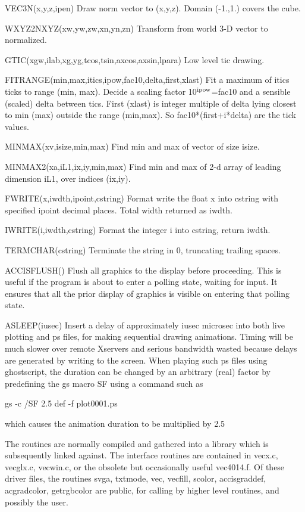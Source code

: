 VEC3N(x,y,z,ipen) Draw norm vector to (x,y,z). Domain (-1.,1.) covers
the cube.

WXYZ2NXYZ(xw,yw,zw,xn,yn,zn) Transform from world 3-D vector to
normalized.

GTIC(xgw,ilab,xg,yg,tcos,tsin,axcos,axsin,lpara) Low level tic drawing.



FITRANGE(min,max,itics,ipow,fac10,delta,first,xlast) Fit a maximum of
itics ticks to range (min, max). Decide a scaling factor 10$^{\rm
ipow}$=fac10 and a sensible (scaled) delta between tics. First (xlast)
is integer multiple of delta lying closest to min (max) outside the
range (min,max). So fac10*(first+i*delta) are the tick values.

MINMAX(xv,isize,min,max) Find min and max of vector of size isize.

MINMAX2(xa,iL1,ix,iy,min,max) Find min and max of 2-d array of
leading dimension iL1, over indices (ix,iy).

FWRITE(x,iwdth,ipoint,cstring) Format write the float x into cstring
with specified ipoint decimal places. Total width returned as iwdth.

IWRITE(i,iwdth,cstring) Format the integer i into cstring, return iwdth.

TERMCHAR(cstring) Terminate the string in 0, truncating trailing spaces.

ACCISFLUSH() Flush all graphics to the display before proceeding. This
is useful if the program is about to enter a polling state, waiting
for input. It ensures that all the prior display of graphics is visible on
entering that polling state.

ASLEEP(iusec) Insert a delay of approximately iusec microsec into both
live plotting and ps files, for making sequential drawing animations.
Timing will be much slower over remote Xservers and serious bandwidth
wasted because delays are generated by writing to the screen. When
playing such ps files using ghostscript, the duration can be changed
by an arbitrary (real) factor by predefining the gs macro SF using a
command such as

gs -c /SF 2.5 def -f plot0001.ps

which causes the animation duration to be multiplied by 2.5


The routines are normally compiled and gathered into a library which
is subsequently linked against. The interface routines are contained
in vecx.c, vecglx.c, vecwin.c, or the obsolete but occasionally useful
vec4014.f. Of these driver files, the routines svga, txtmode, vec,
vecfill, scolor, accisgraddef, acgradcolor, getrgbcolor are public,
for calling by higher level routines, and possibly the user.

